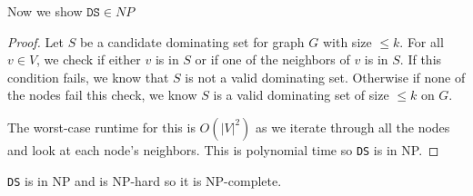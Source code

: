 \documentclass{article}
\begin{document}
Now we show $\texttt{DS} \in NP$

\begin{proof}
    Let $S$ be a candidate dominating set for graph $G$ with size $\leq k$.
    For all $v \in V$, we check if either $v$ is in $S$ or if one of the neighbors of $v$ is in $S$.
    If this condition fails, we know that $S$ is not a valid dominating set.
    Otherwise if none of the nodes fail this check, we know $S$ is a valid dominating set of size $\leq k$ on $G$.
    
    The worst-case runtime for this is $O(|V|^2)$ as we iterate through all the nodes and look at each node's neighbors.
    This is polynomial time so \texttt{DS} is in NP.
\end{proof}

\texttt{DS} is in NP and is NP-hard so it is NP-complete.
\end{document}
